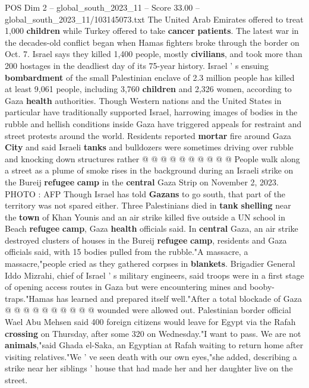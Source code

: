 \begin{textsample}{POS Dim 2 – global\_south\_2023\_11 – Score 33.00 – global\_south\_2023\_11/103145073.txt}
The United Arab Emirates offered to treat 1,000 \textbf{children} while Turkey offered to take \textbf{cancer} \textbf{patients}.
The latest war in the decades-old conflict began when Hamas fighters broke through the border on Oct. 7.
Israel says they killed 1,400 people, mostly \textbf{civilians}, and took more than 200 hostages in the deadliest day of its 75-year history.
Israel ' s ensuing \textbf{bombardment} of the small Palestinian enclave of 2.3 million people has killed at least 9,061 people, including 3,760 \textbf{children} and 2,326 women, according to Gaza \textbf{health} authorities.
Though Western nations and the United States in particular have traditionally supported Israel, harrowing images of bodies in the rubble and hellish conditions inside Gaza have triggered appeals for restraint and street protests around the world.
Residents reported \textbf{mortar} fire around Gaza \textbf{City} and said Israeli \textbf{tanks} and bulldozers were sometimes driving over rubble and knocking down structures rather @ @ @ @ @ @ @ @ @ @ People walk along a street as a plume of smoke rises in the background during an Israeli strike on the Bureij \textbf{refugee} \textbf{camp} in the \textbf{central} Gaza Strip on November 2, 2023.
PHOTO : AFP Though Israel has told \textbf{Gazans} to go south, that part of the territory was not spared either.
Three Palestinians died in \textbf{tank} \textbf{shelling} near the \textbf{town} of Khan Younis and an air strike killed five outside a UN school in Beach \textbf{refugee} \textbf{camp}, Gaza \textbf{health} officials said.
In \textbf{central} Gaza, an air strike destroyed clusters of houses in the Bureij \textbf{refugee} \textbf{camp}, residents and Gaza officials said, with 15 bodies pulled from the rubble."A massacre, a massacre,"people cried as they gathered corpses in \textbf{blankets}.
Brigadier General Iddo Mizrahi, chief of Israel ' s military engineers, said troops were in a first stage of opening access routes in Gaza but were encountering mines and booby-traps."Hamas has learned and prepared itself well."After a total blockade of Gaza @ @ @ @ @ @ @ @ @ @ wounded were allowed out.
Palestinian border official Wael Abu Mehsen said 400 foreign citizens would leave for Egypt via the Rafah \textbf{crossing} on Thursday, after some 320 on Wednesday."I want to pass.
We are not \textbf{animals},"said Ghada el-Saka, an Egyptian at Rafah waiting to return home after visiting relatives."We ' ve seen death with our own eyes,"she added, describing a strike near her siblings ' house that had made her and her daughter live on the street.

\end{textsample}

